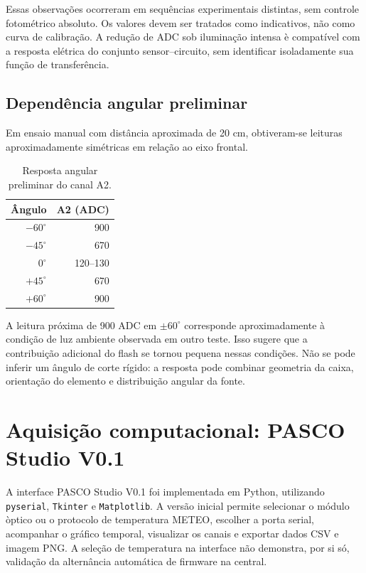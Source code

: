 \documentclass[10pt,a4paper,twocolumn]{article}
\begin{document}
Essas observa\c{c}\~oes ocorreram em sequ\^encias experimentais distintas, sem controle fotom\'etrico absoluto. Os valores devem ser tratados como indicativos, n\~ao como curva de calibra\c{c}\~ao. A redu\c{c}\~ao de ADC sob ilumina\c{c}\~ao intensa \`e compat\'ivel com a resposta el\'etrica do conjunto sensor--circuito, sem identificar isoladamente sua fun\c{c}\~ao de transfer\^encia.

\subsection{Depend\^encia angular preliminar}
Em ensaio manual com dist\^ancia aproximada de 20 cm, obtiveram-se leituras aproximadamente sim\'etricas em rela\c{c}\~ao ao eixo frontal.
\begin{table}[H]
\centering\footnotesize
\caption{Resposta angular preliminar do canal A2.}
\begin{tabular}{@{}rr@{}}
\toprule
\^Angulo & A2 (ADC) \\
\midrule
$-60^\circ$ & 900 \\
$-45^\circ$ & 670 \\
$0^\circ$ & 120--130 \\
$+45^\circ$ & 670 \\
$+60^\circ$ & 900 \\
\bottomrule
\end{tabular}
\end{table}

A leitura pr\'oxima de 900 ADC em $\pm60^\circ$ corresponde aproximadamente \`a condi\c{c}\~ao de luz ambiente observada em outro teste. Isso sugere que a contribui\c{c}\~ao adicional do flash se tornou pequena nessas condi\c{c}\~oes. N\~ao se pode inferir um \^angulo de corte r\'igido: a resposta pode combinar geometria da caixa, orienta\c{c}\~ao do elemento e distribui\c{c}\~ao angular da fonte.

\section{Aquisi\c{c}\~ao computacional: PASCO Studio V0.1}
A interface PASCO Studio V0.1 foi implementada em Python, utilizando \texttt{pyserial}, \texttt{Tkinter} e \texttt{Matplotlib}. A vers\~ao inicial permite selecionar o m\'odulo \`optico ou o protocolo de temperatura METEO, escolher a porta serial, acompanhar o gr\'afico temporal, visualizar os canais e exportar dados CSV e imagem PNG. A sele\c{c}\~ao de temperatura na interface n\~ao demonstra, por si s\'o, valida\c{c}\~ao da altern\^ancia autom\'atica de firmware na central.
\end{document}
